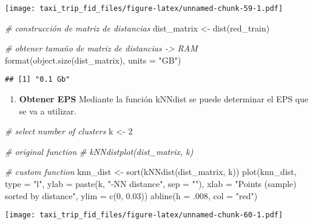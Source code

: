 \documentclass[
]{article}
\newenvironment{Shaded}{\begin{snugshade}}{\end{snugshade}}
\newcommand{\AttributeTok}[1]{\textcolor[rgb]{0.77,0.63,0.00}{#1}}
\newcommand{\CommentTok}[1]{\textcolor[rgb]{0.56,0.35,0.01}{\textit{#1}}}
\newcommand{\DecValTok}[1]{\textcolor[rgb]{0.00,0.00,0.81}{#1}}
\newcommand{\FloatTok}[1]{\textcolor[rgb]{0.00,0.00,0.81}{#1}}
\newcommand{\FunctionTok}[1]{\textcolor[rgb]{0.00,0.00,0.00}{#1}}
\newcommand{\NormalTok}[1]{#1}
\newcommand{\OtherTok}[1]{\textcolor[rgb]{0.56,0.35,0.01}{#1}}
\newcommand{\StringTok}[1]{\textcolor[rgb]{0.31,0.60,0.02}{#1}}
\providecommand{\tightlist}{%
  \setlength{\itemsep}{0pt}\setlength{\parskip}{0pt}}
\begin{document}
\texttt{[image: taxi\_trip\_fid\_files/figure-latex/unnamed-chunk-59-1.pdf]}

\begin{Shaded}
\begin{Highlighting}[]
\CommentTok{\# construcción de matriz de distancias}
\NormalTok{dist\_matrix }\OtherTok{\textless{}{-}} \FunctionTok{dist}\NormalTok{(red\_train)}

\CommentTok{\# obtener tamaño de matriz de distancias {-}\textgreater{} RAM}
\FunctionTok{format}\NormalTok{(}\FunctionTok{object.size}\NormalTok{(dist\_matrix), }\AttributeTok{units =} \StringTok{"GB"}\NormalTok{)}
\end{Highlighting}
\end{Shaded}

\begin{verbatim}
## [1] "0.1 Gb"
\end{verbatim}

\begin{enumerate}
\def\labelenumi{\arabic{enumi}.}
\setcounter{enumi}{1}
\tightlist
\item
  \textbf{Obtener EPS} Mediante la función kNNdist se puede determinar
  el EPS que se va a utilizar.
\end{enumerate}

\begin{Shaded}
\begin{Highlighting}[]
\CommentTok{\# select number of clusters}
\NormalTok{k }\OtherTok{\textless{}{-}} \DecValTok{2}

\CommentTok{\# original function}
\CommentTok{\# kNNdistplot(dist\_matrix, k)}

\CommentTok{\# custom function}
\NormalTok{knn\_dist }\OtherTok{\textless{}{-}} \FunctionTok{sort}\NormalTok{(}\FunctionTok{kNNdist}\NormalTok{(dist\_matrix, k))}
\FunctionTok{plot}\NormalTok{(knn\_dist, }\AttributeTok{type =} \StringTok{"l"}\NormalTok{, }\AttributeTok{ylab =} \FunctionTok{paste}\NormalTok{(k, }\StringTok{"{-}NN distance"}\NormalTok{, }\AttributeTok{sep =} \StringTok{""}\NormalTok{), }\AttributeTok{xlab =} \StringTok{"Points (sample) sorted by distance"}\NormalTok{, }\AttributeTok{ylim =} \FunctionTok{c}\NormalTok{(}\DecValTok{0}\NormalTok{, }\FloatTok{0.03}\NormalTok{))}
\FunctionTok{abline}\NormalTok{(}\AttributeTok{h =}\NormalTok{ .}\DecValTok{008}\NormalTok{, }\AttributeTok{col =} \StringTok{"red"}\NormalTok{)}
\end{Highlighting}
\end{Shaded}

\texttt{[image: taxi\_trip\_fid\_files/figure-latex/unnamed-chunk-60-1.pdf]}
\end{document}
